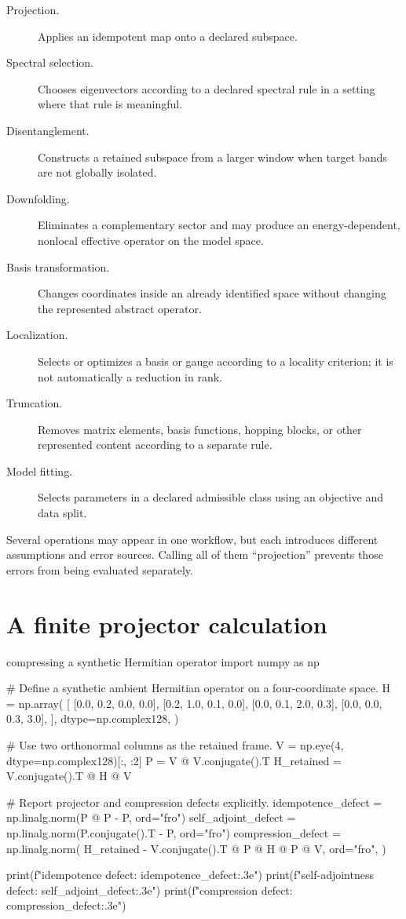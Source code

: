 \begin{description}
  \item[Projection.] Applies an idempotent map onto a declared subspace.
  \item[Spectral selection.] Chooses eigenvectors according to a declared
        spectral rule in a setting where that rule is meaningful.
  \item[Disentanglement.] Constructs a retained subspace from a larger window
        when target bands are not globally isolated.
  \item[Downfolding.] Eliminates a complementary sector and may produce an
        energy-dependent, nonlocal effective operator on the model space.
  \item[Basis transformation.] Changes coordinates inside an already identified
        space without changing the represented abstract operator.
  \item[Localization.] Selects or optimizes a basis or gauge according to a
        locality criterion; it is not automatically a reduction in rank.
  \item[Truncation.] Removes matrix elements, basis functions, hopping blocks,
        or other represented content according to a separate rule.
  \item[Model fitting.] Selects parameters in a declared admissible class using
        an objective and data split.
\end{description}

Several operations may appear in one workflow, but each introduces different
assumptions and error sources. Calling all of them ``projection'' prevents those
errors from being evaluated separately.

\section{A finite projector calculation}

\begin{pythonexample}{compressing a synthetic Hermitian operator}
import numpy as np

# Define a synthetic ambient Hermitian operator on a four-coordinate space.
H = np.array(
    [
        [0.0, 0.2, 0.0, 0.0],
        [0.2, 1.0, 0.1, 0.0],
        [0.0, 0.1, 2.0, 0.3],
        [0.0, 0.0, 0.3, 3.0],
    ],
    dtype=np.complex128,
)

# Use two orthonormal columns as the retained frame.
V = np.eye(4, dtype=np.complex128)[:, :2]
P = V @ V.conjugate().T
H_retained = V.conjugate().T @ H @ V

# Report projector and compression defects explicitly.
idempotence_defect = np.linalg.norm(P @ P - P, ord="fro")
self_adjoint_defect = np.linalg.norm(P.conjugate().T - P, ord="fro")
compression_defect = np.linalg.norm(
    H_retained - V.conjugate().T @ P @ H @ P @ V,
    ord="fro",
)

print(f"idempotence defect: {idempotence_defect:.3e}")
print(f"self-adjointness defect: {self_adjoint_defect:.3e}")
print(f"compression defect: {compression_defect:.3e}")
\end{pythonexample}

